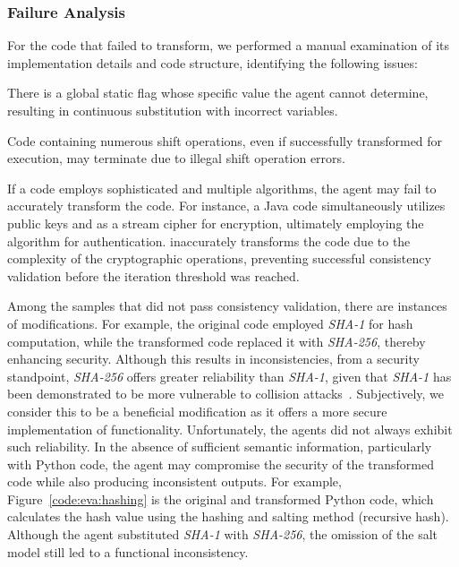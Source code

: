 \subsubsection{Failure Analysis}
For the code that failed to transform, we performed a manual examination of its implementation details and code structure, identifying the following issues:
\begin{description}[leftmargin = 0pt]
    \item [Missing flag variable.] There is a global static flag whose specific value the agent cannot determine, resulting in continuous substitution with incorrect variables.

    \item [Shift operations.]
    Code containing numerous shift operations, even if successfully transformed for execution, may terminate due to illegal shift operation errors.

    \item [Sophisticated cryptography.]
    If a code employs sophisticated and multiple algorithms, the agent may fail to accurately transform the code. 
    For instance, a Java code simultaneously utilizes  public keys and  as a stream cipher for encryption, ultimately employing the  algorithm for authentication.
    \system inaccurately transforms the code due to the complexity of the cryptographic operations, preventing successful consistency validation before the iteration threshold was reached.
    
    \item [Functionality change.]
    Among the samples that did not pass consistency validation, there are instances of  modifications.
    For example, the original code employed \emph{SHA-1} for hash computation, while the transformed code replaced it with \emph{SHA-256}, thereby enhancing security.
    Although this results in inconsistencies, from a security standpoint, \emph{SHA-256} offers greater reliability than \emph{SHA-1}, 
        given that \emph{SHA-1} has been demonstrated to be more vulnerable to collision attacks~\cite{Merrill17limits, wang2005finding}.
    Subjectively, we consider this to be a beneficial modification as it offers a more secure implementation of functionality.
    Unfortunately, the agents did not always exhibit such reliability.
    In the absence of sufficient semantic information, 
        particularly with Python code, 
        the agent may compromise the security of the transformed code while also producing inconsistent outputs.
    For example, Figure~\ref{code:eva:hashing} is the original and transformed Python code, which calculates the hash value using the hashing and salting method (recursive hash).
    Although the agent substituted \emph{SHA-1} with \emph{SHA-256}, the omission of the salt model still led to a functional inconsistency.
\end{description}

